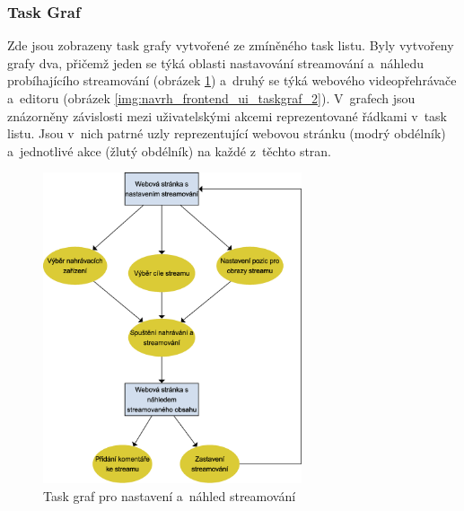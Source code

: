 \documentclass[thesis=M,czech]{FITthesis}[2012/06/26]
\begin{document}
\subsubsection{Task Graf} \label{subsubsec:navrh_frontend_ui_taskgraf}
Zde jsou zobrazeny task grafy vytvořené ze zmíněného task listu. Byly vytvořeny grafy dva, přičemž jeden se týká oblasti nastavování streamování a~náhledu probíhajícího streamování (obrázek \ref{img:navrh_frontend_ui_taskgraf_1}) a~druhý se týká webového videopřehrávače a~editoru (obrázek \ref{img:navrh_frontend_ui_taskgraf_2}). V~grafech jsou znázorněny závislosti mezi uživatelskými akcemi reprezentované řádkami v~task listu. Jsou v~nich patrné uzly reprezentující webovou stránku (modrý obdélník) a~jednotlivé akce (žlutý obdélník) na každé z~těchto stran.

\begin{figure}[h]\centering
	\includegraphics[width=0.68\textwidth]{images/ui_task_flow_1.eps}
	\caption{Task graf pro nastavení a~náhled streamování}\label{img:navrh_frontend_ui_taskgraf_1}
\end{figure}
\end{document}
